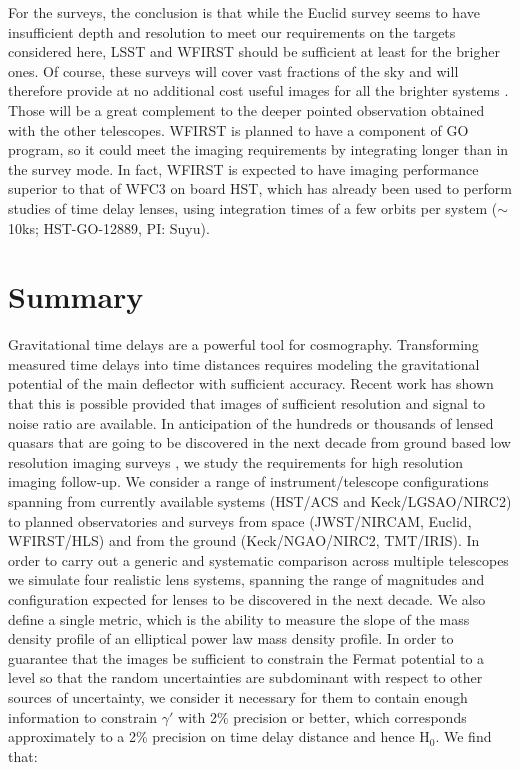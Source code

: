 \documentclass[a4paper,11pt]{article}
\begin{document}
For the surveys, the conclusion is that while the Euclid survey seems
to have insufficient depth and resolution to meet our requirements on
the targets considered here, LSST and WFIRST should be sufficient at
least for the brigher ones. Of course, these surveys will cover vast
fractions of the sky and will therefore provide at no additional cost
useful images for all the brighter systems
\cite{2009astro2010S.159K}. Those will be a great complement to the
deeper pointed observation obtained with the other telescopes. WFIRST
is planned to have a component of GO program, so it could meet the
imaging requirements by integrating longer than in the survey mode. In
fact, WFIRST is expected to have imaging performance superior to that
of WFC3 on board HST, which has already been used to perform studies
of time delay lenses, using integration times of a few orbits per
system ($\sim$10ks; HST-GO-12889, PI: Suyu).

\section{Summary}

Gravitational time delays are a powerful tool for
cosmography. Transforming measured time delays into time distances
requires modeling the gravitational potential of the main deflector
with sufficient accuracy. Recent work has shown that this is possible
provided that images of sufficient resolution and signal to noise
ratio are available. In anticipation of the hundreds or thousands of
lensed quasars that are going to be discovered in the next decade from
ground based low resolution imaging surveys
\cite{2010MNRAS.405.2579O}, we study the requirements for high
resolution imaging follow-up. We consider a range of
instrument/telescope configurations spanning from currently available
systems (HST/ACS and Keck/LGSAO/NIRC2) to planned observatories and
surveys from space (JWST/NIRCAM, Euclid, WFIRST/HLS) and from the
ground (Keck/NGAO/NIRC2, TMT/IRIS). In order to carry out a generic
and systematic comparison across multiple telescopes we simulate four
realistic lens systems, spanning the range of magnitudes and
configuration expected for lenses to be discovered in the next
decade. We also define a single metric, which is the ability to
measure the slope of the mass density profile of an elliptical power
law mass density profile. In order to guarantee that the images be
sufficient to constrain the Fermat potential to a level so that the
random uncertainties are subdominant with respect to other sources of
uncertainty, we consider it necessary for them to contain enough
information to constrain $\gamma'$ with 2\% precision or better, which
corresponds approximately to a 2\% precision on time delay distance
and hence H$_0$. We find that:
\end{document}
